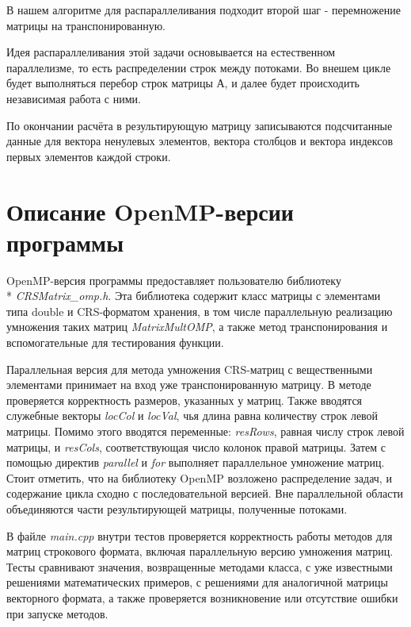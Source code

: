 \documentclass[14pt, russian]{extarticle}
\begin{document}
    \indent	В нашем алгоритме  для распараллеливания подходит второй шаг  - перемножение матрицы на транспонированную.
    
	\indent Идея распараллеливания этой задачи основывается на естественном параллелизме, то есть распределении строк между потоками. Во внешем цикле будет выполняться перебор строк матрицы А,  и далее будет происходить независимая работа с ними.
 
	\indent По окончании расчёта в результирующую матрицу записываются подсчитанные данные для вектора ненулевых элементов, вектора столбцов и вектора индексов первых элементов каждой строки.

	\newpage

	\section{Описание OpenMP-версии программы}
	
	\indent OpenMP-версия программы предоставляет пользователю библиотеку\\* \emph{CRSMatrix\_omp.h}. Эта библиотека содержит класс матрицы с элементами типа double и CRS-форматом хранения, в том числе параллельную реализацию умножения таких матриц \emph{MatrixMultOMP}, а также метод транспонирования и вспомогательные для тестирования функции. 

    Параллельная версия для метода умножения CRS-матриц с вещественными элементами принимает на вход уже транспонированную матрицу. В методе проверяется корректность размеров, указанных у матриц. Также вводятся служебные векторы \emph{locCol} и \emph{locVal}, чья длина равна количеству строк левой матрицы. Помимо этого вводятся переменные: \emph{resRows}, равная числу строк левой матрицы, и \emph{resCols}, соответствующая число колонок правой матрицы. Затем с помощью директив \emph{parallel} и \emph{for} выполняет параллельное умножение матриц. Стоит отметить, что на библиотеку OpenMP возложено распределение задач, и содержание цикла сходно с последовательной версией. Вне параллельной области объединяются части результирующей матрицы, полученные потоками.
    
    В файле \emph{main.cpp} внутри тестов проверяется корректность работы методов для матриц строкового формата, включая параллельную версию умножения матриц. Тесты сравнивают значения, возвращенные методами класса, с уже известными решениями математических примеров, с решениями для аналогичной матрицы векторного формата, а также проверяется возникновение или отсутствие ошибки при запуске методов.
	\newpage
	
\end{document}
